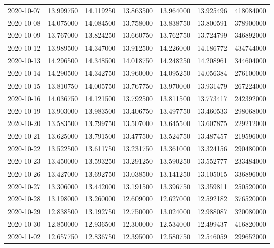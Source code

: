 \begin{tabular}{lrrrrrr}
2020-10-07 &   13.999750 &   14.119250 &   13.863500 &   13.964000 &   13.925496 &   418084000 \\
2020-10-08 &   14.075000 &   14.084500 &   13.758000 &   13.838750 &   13.800591 &   378900000 \\
2020-10-09 &   13.767000 &   13.824250 &   13.660750 &   13.762750 &   13.724799 &   346892000 \\
2020-10-12 &   13.989500 &   14.347000 &   13.912500 &   14.226000 &   14.186772 &   434744000 \\
2020-10-13 &   14.296500 &   14.348500 &   14.018750 &   14.248250 &   14.208961 &   344604000 \\
2020-10-14 &   14.290500 &   14.342750 &   13.960000 &   14.095250 &   14.056384 &   276100000 \\
2020-10-15 &   13.810750 &   14.005750 &   13.767750 &   13.970000 &   13.931479 &   267224000 \\
2020-10-16 &   14.036750 &   14.121500 &   13.792500 &   13.811500 &   13.773417 &   242392000 \\
2020-10-19 &   13.903000 &   13.983500 &   13.406750 &   13.497750 &   13.460533 &   298068000 \\
2020-10-20 &   13.583500 &   13.799750 &   13.507000 &   13.645500 &   13.607875 &   229212000 \\
2020-10-21 &   13.625000 &   13.791500 &   13.477500 &   13.524750 &   13.487457 &   219596000 \\
2020-10-22 &   13.522500 &   13.611750 &   13.231750 &   13.361000 &   13.324156 &   290480000 \\
2020-10-23 &   13.450000 &   13.593250 &   13.291250 &   13.590250 &   13.552777 &   233484000 \\
2020-10-26 &   13.427000 &   13.692750 &   13.038500 &   13.141250 &   13.105015 &   336896000 \\
2020-10-27 &   13.306000 &   13.442000 &   13.191500 &   13.396750 &   13.359811 &   250520000 \\
2020-10-28 &   13.198000 &   13.260000 &   12.609000 &   12.627000 &   12.592182 &   376520000 \\
2020-10-29 &   12.838500 &   13.192750 &   12.750000 &   13.024000 &   12.988087 &   320080000 \\
2020-10-30 &   12.850000 &   12.936500 &   12.300000 &   12.534000 &   12.499437 &   416820000 \\
2020-11-02 &   12.657750 &   12.836750 &   12.395000 &   12.580750 &   12.546059 &   299652000 \\

\end{tabular}
